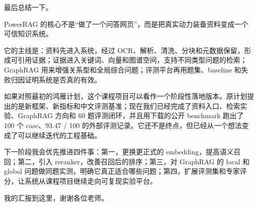 \documentclass[10pt, a4paper]{ctexart}
\begin{document}
\begin{tcolorbox}[colback=white, colframe=primary!35, title={\textbf{第 20 页：最后回到初心}}, beforeafter skip=2.0pt]
\begin{minipage}[t]{0.72\textwidth}
  \linespread{1.0}\selectfont\footnotesize
  最后总结一下。

PowerRAG 的核心不是“做了一个问答网页”，而是把真实动力装备资料变成一个可信知识系统。

它的主线是：资料先进入系统，经过 OCR、解析、清洗、分块和元数据保留，形成可引用证据；证据进入关键词、向量和图谱空间，支持不同类型问题的检索；GraphRAG 用来增强关系型和全局综合问题；评测平台再用题集、baseline 和失败归因证明系统是否真的有效。

如果对照最初的鸿雁计划，这个课程项目可以看作一个阶段性落地版本。原计划提出的是新框架、新指标和中文评测基准；现在我们已经完成了资料入口、检索实验、GraphRAG 方向和 60 题评测闭环，并且用下载的公开 benchmark 跑出了 100 个 case、93.47 / 100 的外部评测记录。它还不是终点，但已经从一个想法变成了可以继续迭代的工程基础。

下一阶段我会优先推进四件事：第一，更换更正式的 embedding，提高语义召回；第二，引入 reranker，改善召回后的排序；第三，对 GraphRAG 的 local 和 global 问题做同题实测，明确它真正适合哪些问题；第四，扩展评测集和专家评分，让系统从课程项目继续走向可复现实验平台。

我的汇报到这里，谢谢各位老师。
\end{minipage}
\hfill
\begin{minipage}[t]{0.25\textwidth}
  \fontsize{7.5}{9.5}\selectfont
  \begin{tcolorbox}[colback=orange!5, colframe=orange!45, title=\textbf{讲述重点}, left=0.6mm, right=0.6mm, top=0.8mm, bottom=0.8mm, arc=0.8mm, boxrule=0.4pt, beforeafter skip=0pt]
    
  \end{tcolorbox}
\end{minipage}
\end{tcolorbox}


\newpage
\end{document}
